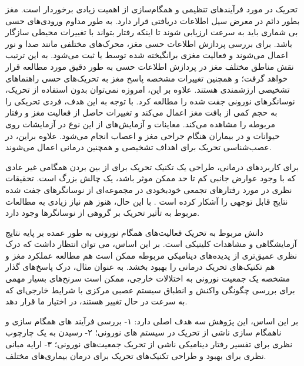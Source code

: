 تحریک در مورد فرآیند‌های تنظیمی و همگام‌سازی از اهمیت زیادی برخوردار است. مغز بطور دائم در معرض سیل اطلاعات دریافتی قرار دارد. به طور مداوم ورودی‌های حسی بی شماری باید به سرعت ارزیابی شوند تا اینکه رفتار بتواند با تغییرات محیطی سازگار باشد. برای بررسی پردازش اطلاعات حسی مغز، محرک‌های مختلفی مانند صدا و نور اعمال می‌شوند و فعالیت مغزی برانگیخته شده توسط 
یا 
ثبت می‌شود. به این ترتیب نقش مناطق مختلف مغز در پردازش اطلاعات حسی به طور دقیق مورد مطالعه قرار خواهد گرفت؛ و همچنین تغییرات مشخصه پاسخ مغز به تحریک‌های حسی راهنماهای تشخیصی ارزشمندی هستند. علاوه بر این، امروزه نمی‌توان بدون استفاده از تحریک، نوسانگرهای نورونی جفت شده را مطالعه کرد. با توجه به این هدف، فردی تحریکی را به حجم کمی از بافت مغز اعمال می‌کند و تغییرات حاصل از فعالیت مغز و رفتار مربوطه را مشاهده می‌کند. معاینات و آزمایش‌های از این نوع در آزمایشات روی حیوانات و در بیماران هنگام جراحی مغز و اعصاب انجام می‌شود. علاوه براین، در عصب‌شناسی تحریک برای اهداف تشخیصی و همچنین درمانی اعمال می‌شوند. 

برای کاربردهای درمانی، طراحی یک تکنیک تحریک برای از بین بردن همگامی غیر عادی که با وجود عوارض جانبی کم تا حد ممکن موثر باشد، یک چالش بزرگ است. تحقیقات نظری در مورد رفتارهای تجمعی خودبخودی در مجموعه‌ای از نوسانگرهای جفت شده نتایج قابل توجهی را آشکار کرده است
. با این حال، هنوز هم نیاز زیادی به مطالعات مربوط به تأثیر تحریک بر گروهی از نوسانگرها وجود دارد.


دانش مربوط به تحریک فعالیت‌های همگام نورونی به طور عمده بر پایه نتایج آزمایشگاهی و مشاهدات کلینیکی است. بر این اساس، می توان انتظار داشت که درک نظری عمیق‌تری از پدیده‌‌های دینامیکی مربوطه ممکن است هم مطالعه عملکرد مغز و هم تکنیک‌های تحریک درمانی را بهبود بخشد. به عنوان مثال، درک پاسخ‌های گذار مشخصه
یک جمعیت نورونی به اختلالات خارجی، ممکن است سرنخ‌های بسیار مهمی برای بررسی چگونگی واکنش و انطباق سیستم عصبی مرکزی با شرایط خارجی‌ای که به سرعت در حال تغییر هستند، در اختیار ما قرار دهد.


بر این اساس، این پژوهش سه هدف اصلی دارد: 
۱- بررسی فرآیند های همگام سازی و ناهمگام سازی ناشی از تحریک در سیستم های نورونی؛ ۲- رسیدن به یک چارچوب نظری برای تفسیر رفتار دینامیکی ناشی از تحریک جمعیت‌های نورونی؛ ۳- ارایه مبانی نظری برای بهبود و طراحی تکنیک‌های تحریک برای درمان بیماری‌های مختلف.


